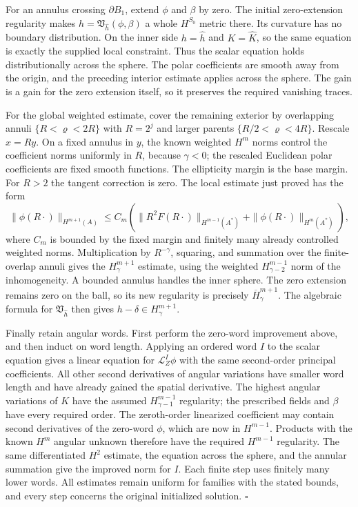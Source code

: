 \documentclass[
  english,
  11pt,
  reqno]{amsart}
\begin{document}
For an annulus crossing \(\partial B_1\), extend \(\phi\) and \(\beta\)
by zero. The initial zero-extension regularity makes
\(h=\mathfrak V_{\widehat h}(\phi,\beta)\) a whole \(H^{S_0}\) metric
there. Its curvature has no boundary distribution. On the inner side
\(h=\widehat h\) and \(K=\widehat K\), so the same equation is exactly
the supplied local constraint. Thus the scalar equation holds
distributionally across the sphere. The polar coefficients are smooth
away from the origin, and the preceding interior estimate applies across
the sphere. The gain is a gain for the zero extension itself, so it
preserves the required vanishing traces.

For the global weighted estimate, cover the remaining exterior by
overlapping annuli \(\{R<\varrho<2R\}\) with \(R=2^j\) and larger
parents \(\{R/2<\varrho<4R\}\). Rescale \(x=Ry\). On a fixed annulus in
\(y\), the known weighted \(H^m\) norms control the coefficient norms
uniformly in \(R\), because \(\gamma<0\); the rescaled Euclidean polar
coefficients are fixed smooth functions. The ellipticity margin is the
base margin. For \(R>2\) the tangent correction is zero. The local
estimate just proved has the form%
 \[
\|\phi(R\cdot)\|_{H^{m+1}(A)}
\le C_m\left(
\|R^2F(R\cdot)\|_{H^{m-1}(A^*)}
+\|\phi(R\cdot)\|_{H^m(A^*)}\right),
\] where \(C_m\) is bounded by the fixed margin and finitely many
already controlled weighted norms. Multiplication by \(R^{-\gamma}\),
squaring, and summation over the finite-overlap annuli gives the
\(H^{m+1}_\gamma\) estimate, using the weighted \(H^{m-1}_{\gamma-2}\)
norm of the inhomogeneity. A bounded annulus handles the inner sphere.
The zero extension remains zero on the ball, so its new regularity is
precisely \(\overline H^{m+1}_\gamma\). The algebraic formula for
\(\mathfrak V_{\widehat h}\) then gives \(h-\delta\in H^{m+1}_\gamma\).

Finally retain angular words. First perform the zero-word improvement
above, and then induct on word length. Applying an ordered word \(I\) to
the scalar equation gives a linear equation for \(\mathcal L_Z^I\phi\)
with the same second-order principal coefficients. All other second
derivatives of angular variations have smaller word length and have
already gained the spatial derivative. The highest angular variations of
\(K\) have the assumed \(H^{m-1}_{\gamma-1}\) regularity; the prescribed
fields and \(\beta\) have every required order. The zeroth-order
linearized coefficient may contain second derivatives of the zero-word
\(\phi\), which are now in \(H^{m-1}\). Products with the known \(H^m\)
angular unknown therefore have the required \(H^{m-1}\) regularity. The
same differentiated \(H^2\) estimate, the equation across the sphere,
and the annular summation give the improved norm for \(I\). Each finite
step uses finitely many lower words. All estimates remain uniform for
families with the stated bounds, and every step concerns the original
initialized solution. \hfill\(\square\)
\end{document}
